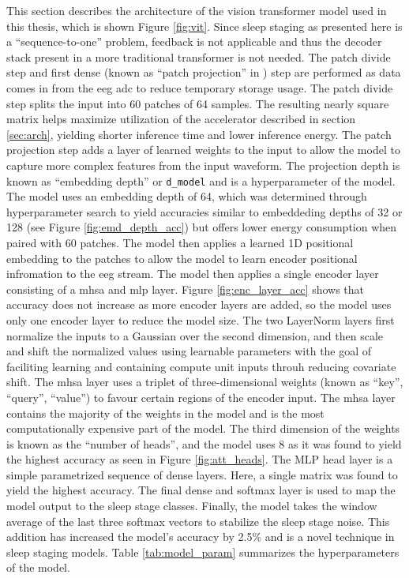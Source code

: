This section describes the architecture of the vision transformer model used in this thesis, which is shown Figure \ref{fig:vit}. Since sleep staging as presented
here is a ``sequence-to-one'' problem, feedback is not applicable and thus the decoder stack present in a more traditional transformer is not needed. The patch divide step and
first dense (known as ``patch projection'' in \cite{dosovitskiy2010image}) step are performed as data comes in from the \ac{eeg} \ac{adc} to reduce temporary storage usage. The 
patch divide step splits the input into 60 patches of 64 samples. The resulting nearly square matrix helps maximize utilization of the accelerator described in section \ref{sec:arch},
yielding shorter inference time and lower inference energy. The patch projection step adds a layer of learned weights to the input to allow the model to capture more complex features
from the input waveform. The projection depth is known as ``embedding depth'' or \texttt{d\_model} and is a hyperparameter of the model. The model uses an embedding depth of 64,
which was determined through hyperparameter search to yield accuracies similar to embeddeding depths of 32 or 128 (see Figure \ref{fig:emd_depth_acc}) but offers lower energy
consumption when paired with 60 patches. The model then applies a learned 1D positional embedding to the patches to allow the model to learn encoder positional infromation to the \ac{eeg}
stream. The model then applies a single encoder layer consisting of a \ac{mhsa} and \ac{mlp} layer. Figure \ref{fig:enc_layer_acc} shows that accuracy does not increase as more 
encoder layers are added, so the model uses only one encoder layer to reduce the model size. The two LayerNorm layers first normalize the inputs to a Gaussian over the second dimension,
and then scale and shift the normalized values using learnable parameters with the goal of faciliting learning and containing compute unit inputs throuh reducing covariate shift. The
\ac{mhsa} layer uses a triplet of three-dimensional weights (known as ``key'', ``query'', ``value'') to favour certain regions of the encoder input. The \ac{mhsa} layer contains the majority
of the weights in the model and is the most computationally expensive part of the model. The third dimension of the weights is known as the ``number of heads'', and the model uses 8
as it was found to yield the highest accuracy as seen in Figure \ref{fig:att_heads}. The MLP head layer is a simple parametrized sequence of dense layers. Here, a single matrix was found
to yield the highest accuracy. The final dense and softmax layer is used to map the model output to the sleep stage classes. Finally, the model takes the window average of the last
three softmax vectors to stabilize the sleep stage noise. This addition has increased the model's accuracy by 2.5\% and is a novel technique in sleep staging models. Table
\ref{tab:model_param} summarizes the hyperparameters of the model.

